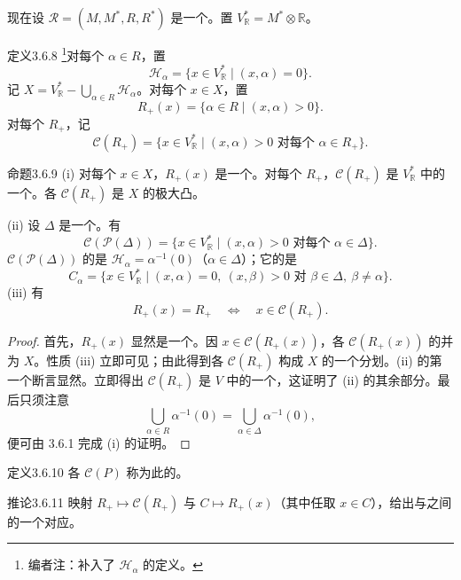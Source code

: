 现在设 $\mathscr R=(M,M^*,R,R^*)$ 是一个。置 $V_{\mathbb R}^*=M^*\otimes\mathbb R$。
\begin{SGAresult}{定义}{3.6.8}
\footnote{编者注：补入了 $\mathscr H_\alpha$ 的定义。}对每个 $\alpha\in R$，置
\[\mathscr H_\alpha=\{x\in V_{\mathbb R}^*\mid(x,\alpha)=0\}.\]
记 $X=V_{\mathbb R}^*-\bigcup_{\alpha\in R}\mathscr H_\alpha$。对每个 $x\in X$，置
\[R_+(x)=\{\alpha\in R\mid(x,\alpha)>0\}.\]
对每个 $R_+$，记
\[\mathscr C(R_+)=\{x\in V_{\mathbb R}^*\mid(x,\alpha)>0\text{ 对每个 }\alpha\in R_+\}.\]
\end{SGAresult}
\begin{SGAresult}{命题}{3.6.9}
(i) 对每个 $x\in X$，$R_+(x)$ 是一个。对每个 $R_+$，$\mathscr C(R_+)$ 是 $V_{\mathbb R}^*$ 中的一个。各 $\mathscr C(R_+)$ 是 $X$ 的极大凸。

(ii) 设 $\Delta$ 是一个。有
\[\mathscr C(\mathscr P(\Delta))=\{x\in V_{\mathbb R}^*\mid(x,\alpha)>0\text{ 对每个 }\alpha\in\Delta\}.\]
$\mathscr C(\mathscr P(\Delta))$ 的是 $\mathscr H_\alpha=\alpha^{-1}(0)$（$\alpha\in\Delta$）；它的是
\[C_\alpha=\{x\in V_{\mathbb R}^*\mid(x,\alpha)=0,\ (x,\beta)>0\text{ 对 }\beta\in\Delta,\ \beta\ne\alpha\}.\]
(iii) 有
\[R_+(x)=R_+\quad\Longleftrightarrow\quad x\in\mathscr C(R_+).\]
\end{SGAresult}
\begin{proof}
首先，$R_+(x)$ 显然是一个。因 $x\in\mathscr C(R_+(x))$，各 $\mathscr C(R_+(x))$ 的并为 $X$。性质 (iii) 立即可见；由此得到各 $\mathscr C(R_+)$ 构成 $X$ 的一个分划。(ii) 的第一个断言显然。立即得出 $\mathscr C(R_+)$ 是 $V$ 中的一个，这证明了 (ii) 的其余部分。最后只须注意
\[\bigcup_{\alpha\in R}\alpha^{-1}(0)=\bigcup_{\alpha\in\Delta}\alpha^{-1}(0),\]
便可由 3.6.1 完成 (i) 的证明。
\end{proof}
\begin{SGAresult}{定义}{3.6.10}
各 $\mathscr C(P)$ 称为此的。
\end{SGAresult}
\begin{SGAresult}{推论}{3.6.11}
映射 $R_+\mapsto\mathscr C(R_+)$ 与 $C\mapsto R_+(x)$（其中任取 $x\in C$），给出与之间的一个对应。
\end{SGAresult}
